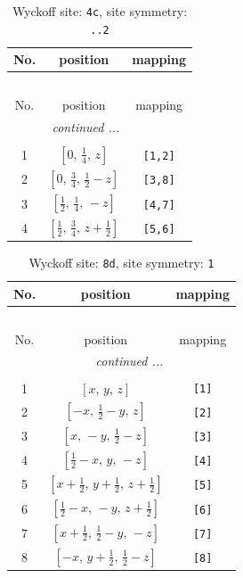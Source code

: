 \documentclass[fleqn,8pt]{jsarticle}
\begin{document}
\renewcommand{\arraystretch}{1.2}
\begin{longtable}{ccc}
\caption{Wyckoff site: {\tt 4c}, site symmetry: {\tt ..2}}
 \\
 \hline \hline
No. & position & mapping \\ \hline \endfirsthead

\multicolumn{2}{l}{\tablename\ \thetable{}} \\
 \hline \hline
No. & position & mapping \\ \hline \endhead

 \hline \hline
\multicolumn{2}{r}{\footnotesize\it continued ...} \\ \endfoot

 \hline \hline
\multicolumn{2}{r}{} \\ \endlastfoot

1 & $\left[ 0,\, \frac{1}{4},\, z \right]$ & {\tt [1,2]} \\ \hline
2 & $\left[ 0,\, \frac{3}{4},\, \frac{1}{2} - z \right]$ & {\tt [3,8]} \\ \hline
3 & $\left[ \frac{1}{2},\, \frac{1}{4},\, - z \right]$ & {\tt [4,7]} \\ \hline
4 & $\left[ \frac{1}{2},\, \frac{3}{4},\, z + \frac{1}{2} \right]$ & {\tt [5,6]} \\
\end{longtable}
\renewcommand{\arraystretch}{1.2}
\begin{longtable}{ccc}
\caption{Wyckoff site: {\tt 8d}, site symmetry: {\tt 1}}
 \\
 \hline \hline
No. & position & mapping \\ \hline \endfirsthead

\multicolumn{2}{l}{\tablename\ \thetable{}} \\
 \hline \hline
No. & position & mapping \\ \hline \endhead

 \hline \hline
\multicolumn{2}{r}{\footnotesize\it continued ...} \\ \endfoot

 \hline \hline
\multicolumn{2}{r}{} \\ \endlastfoot

1 & $\left[ x,\, y,\, z \right]$ & {\tt [1]} \\ \hline
2 & $\left[ - x,\, \frac{1}{2} - y,\, z \right]$ & {\tt [2]} \\ \hline
3 & $\left[ x,\, - y,\, \frac{1}{2} - z \right]$ & {\tt [3]} \\ \hline
4 & $\left[ \frac{1}{2} - x,\, y,\, - z \right]$ & {\tt [4]} \\ \hline
5 & $\left[ x + \frac{1}{2},\, y + \frac{1}{2},\, z + \frac{1}{2} \right]$ & {\tt [5]} \\ \hline
6 & $\left[ \frac{1}{2} - x,\, - y,\, z + \frac{1}{2} \right]$ & {\tt [6]} \\ \hline
7 & $\left[ x + \frac{1}{2},\, \frac{1}{2} - y,\, - z \right]$ & {\tt [7]} \\ \hline
8 & $\left[ - x,\, y + \frac{1}{2},\, \frac{1}{2} - z \right]$ & {\tt [8]} \\
\end{longtable}
\end{document}
